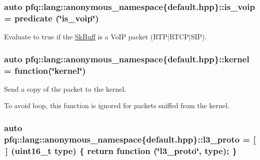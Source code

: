 \subsubsection[{\texorpdfstring{is\+\_\+voip}{is_voip}}]{\setlength{\rightskip}{0pt plus 5cm}auto pfq\+::lang\+::anonymous\+\_\+namespace\{default.\+hpp\}\+::is\+\_\+voip = {\bf predicate} (\char`\"{}is\+\_\+voip\char`\"{})}\hypertarget{namespacepfq_1_1lang_1_1anonymous__namespace_02default_8hpp_03_a79aa9beec811d735d03b40f85b4773c5}{}\label{namespacepfq_1_1lang_1_1anonymous__namespace_02default_8hpp_03_a79aa9beec811d735d03b40f85b4773c5}


Evaluate to {\ttfamily true} if the \hyperlink{structpfq_1_1lang_1_1SkBuff}{Sk\+Buff} is a Vo\+IP packet (R\+T\+P$\vert$\+R\+T\+C\+P$\vert$\+S\+IP). 

\subsubsection[{\texorpdfstring{kernel}{kernel}}]{\setlength{\rightskip}{0pt plus 5cm}auto pfq\+::lang\+::anonymous\+\_\+namespace\{default.\+hpp\}\+::kernel = {\bf function}(\char`\"{}kernel\char`\"{})}\hypertarget{namespacepfq_1_1lang_1_1anonymous__namespace_02default_8hpp_03_a93294225145f96c6aa6cf0cedfa19103}{}\label{namespacepfq_1_1lang_1_1anonymous__namespace_02default_8hpp_03_a93294225145f96c6aa6cf0cedfa19103}


Send a copy of the packet to the kernel. 

To avoid loop, this function is ignored for packets sniffed from the kernel. 
\subsubsection[{\texorpdfstring{l3\+\_\+proto}{l3_proto}}]{\setlength{\rightskip}{0pt plus 5cm}auto pfq\+::lang\+::anonymous\+\_\+namespace\{default.\+hpp\}\+::l3\+\_\+proto = \mbox{[}$\,$\mbox{]} (uint16\+\_\+t type) \{ return {\bf function} (\char`\"{}l3\+\_\+proto\char`\"{}, type); \}}\hypertarget{namespacepfq_1_1lang_1_1anonymous__namespace_02default_8hpp_03_a1515f230673119530cd04f213627976f}{}\label{namespacepfq_1_1lang_1_1anonymous__namespace_02default_8hpp_03_a1515f230673119530cd04f213627976f}


